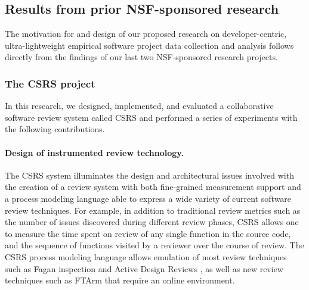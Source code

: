 \subsection{Results from prior NSF-sponsored research}


The motivation for and design of our proposed research on
developer-centric, ultra-lightweight empirical software project data
collection and analysis follows directly from the findings of our last two
NSF-sponsored research projects.

\subsubsection{The CSRS project}



In this research, we designed, implemented, and evaluated a collaborative
software review system called CSRS and performed a series of experiments
with the following contributions.

 
\vspace*{-.15in} \paragraph{Design of instrumented review technology.} The CSRS system
illuminates the design and architectural issues involved with the creation
of a review system with both fine-grained measurement support and a process
modeling language able to express a wide variety of current software
review techniques. For example, in addition to traditional review metrics
such as the number of issues discovered during different review phases,
CSRS allows one to measure the time spent on review of any single function
in the source code, and the sequence of functions visited by a reviewer
over the course of review. The CSRS process modeling language allows
emulation of most review techniques such as Fagan inspection \cite{Fagan76}
and Active Design Reviews \cite{Parnas85}, as well as new review techniques
such as FTArm that require an online environment.

